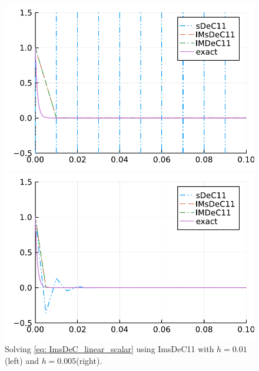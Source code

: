 \begin{figure}
	\centering
	\begin{minipage}[t]{0.45\textwidth}
		\includegraphics[width=\textwidth]{pdf/odepics/BspImsDeC/sol_ImsDeC11_GLB_stable1000.pdf}
	\end{minipage}
	\begin{minipage}[t]{0.45\textwidth}
		\includegraphics[width=\textwidth]{pdf/odepics/BspImsDeC/sol_ImsDeC11_GLB_stable2000.pdf}
	\end{minipage}
	\caption{Solving \eqref{eq: ImsDeC_linear_scalar} using ImsDeC11 with $h=0.01$(left) and $h=0.005$(right).}
	\label{fig: exaImsDeC2}
\end{figure}

